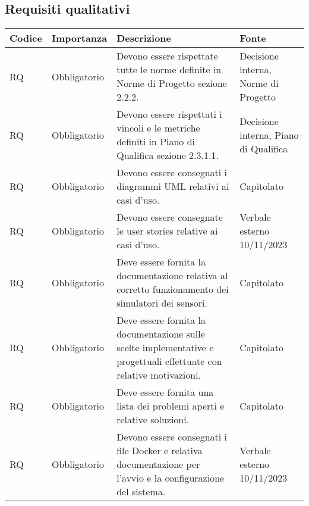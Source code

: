 \subsection{Requisiti qualitativi}
\setcounter{rowcounter}{0}
\begin{longtable}{|C{1.5cm}|C{2cm}|L{5cm}|C{2cm}|}
    \hline
    \textbf{Codice} & \textbf{Importanza} & \textbf{Descrizione} & \textbf{Fonte} \\

    \hline
     RQ & Obbligatorio & Devono essere rispettate tutte le norme definite in Norme di Progetto sezione 2.2.2. & Decisione interna, Norme di Progetto\\

    \hline
     RQ & Obbligatorio & Devono essere rispettati i vincoli e le metriche definiti in Piano di Qualifica sezione 2.3.1.1. & Decisione interna, Piano di Qualifica \\

    \hline
     RQ & Obbligatorio & Devono essere consegnati i diagrammi UML relativi ai casi d'uso. & Capitolato \\

    \hline
     RQ & Obbligatorio & Devono essere consegnate le user stories relative ai casi d'uso. & Verbale esterno 10/11/2023 \\

    \hline
     RQ & Obbligatorio & Deve essere fornita la documentazione relativa al corretto funzionamento dei simulatori dei sensori. & Capitolato \\

    \hline
     RQ & Obbligatorio & Deve essere fornita la documentazione sulle scelte implementative e progettuali effettuate con relative motivazioni. & Capitolato \\

    \hline
     RQ & Obbligatorio & Deve essere fornita una lista dei problemi aperti e relative soluzioni. & Capitolato \\

    \hline
     RQ & Obbligatorio & Devono essere consegnati i file Docker e relativa documentazione per l'avvio e la configurazione del sistema. & Verbale esterno 10/11/2023 \\


\end{longtable}
